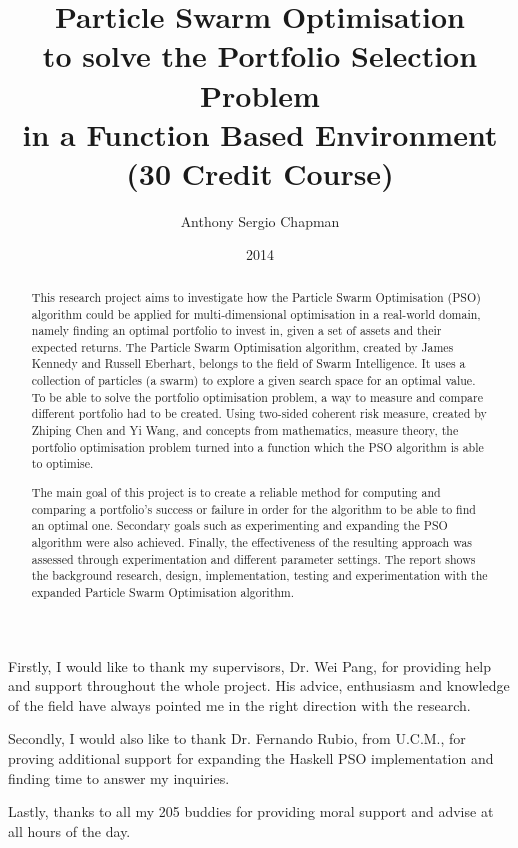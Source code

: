 \documentclass[bsc,doublespace]{abdnthesis}
\title{Particle Swarm Optimisation \\ to solve the Portfolio Selection Problem \\ in a Function Based Environment \\ (30 Credit Course)}
\author{Anthony Sergio Chapman}
\date{2014}
\begin{document}

\maketitle
\makedeclaration


\begin{abstract}
  This research project aims to investigate how the Particle Swarm Optimisation (PSO) algorithm could be applied for multi-dimensional optimisation in a real-world domain, namely finding an optimal portfolio to invest in, given a set of assets and their expected returns. The Particle Swarm Optimisation algorithm, created by James Kennedy and Russell Eberhart, belongs to the field of Swarm Intelligence. It uses a collection of particles (a swarm) to explore a given search space for an optimal value. To be able to solve the portfolio optimisation problem, a way to measure and compare different portfolio had to be created. Using two-sided coherent risk measure, created by Zhiping Chen and Yi Wang, and concepts from mathematics, measure theory, the portfolio optimisation problem turned into a function which the PSO algorithm is able to optimise. 

  The main goal of this project is to create a reliable method for computing and comparing a portfolio's success or failure in order for the algorithm to be able to find an optimal one. Secondary goals such as experimenting and expanding the PSO algorithm were also achieved. Finally, the effectiveness of the resulting approach was assessed through experimentation and different parameter settings. The report shows the background research, design, implementation, testing and experimentation with the expanded Particle Swarm Optimisation algorithm. 
\end{abstract}

\begin{acknowledgements}
  Firstly, I would like to thank my supervisors, Dr. Wei Pang, for providing help and support throughout the whole project. His advice, enthusiasm and knowledge of the field have always pointed me in the right direction with the research. 

  Secondly, I would also like to thank Dr. Fernando Rubio, from U.C.M., for proving additional support for expanding the Haskell PSO implementation and finding time to answer my inquiries. 

  Lastly, thanks to all my 205 buddies for providing moral support and advise at all hours of the day.
\end{acknowledgements}
\end{document}
